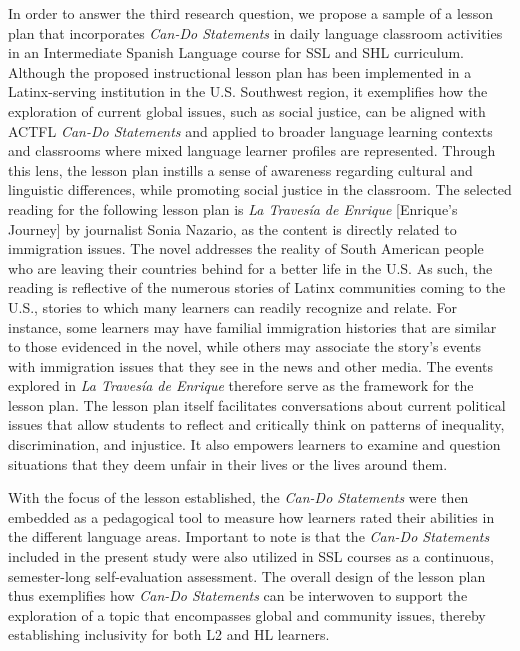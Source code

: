 \documentclass[output=paper]{langscibook}
\begin{document}
In order to answer the third research question, we propose a sample of a lesson plan that incorporates \textit{Can-Do Statements} in daily language classroom activities in an Intermediate Spanish Language course for SSL and SHL curriculum. Although the proposed instructional lesson plan has been implemented in a Latinx-serving institution in the U.S. Southwest region, it exemplifies how the exploration of current global issues, such as social justice, can be aligned with ACTFL \textit{Can-Do Statements} and applied to broader language learning contexts and classrooms where mixed language learner profiles are represented. Through this lens, the lesson plan instills a sense of awareness regarding cultural and linguistic differences, while promoting social justice in the classroom. The selected reading for the following lesson plan is \textit{La Travesía de Enrique} [Enrique’s Journey] by journalist Sonia Nazario, as the content is directly related to immigration issues. The novel addresses the reality of South American people who are leaving their countries behind for a better life in the U.S. As such, the reading is reflective of the numerous stories of Latinx communities coming to the U.S., stories to which many learners can readily recognize and relate. For instance, some learners may have familial immigration histories that are similar to those evidenced in the novel, while others may associate the story’s events with immigration issues that they see in the news and other media. The events explored in \textit{La Travesía de Enrique} therefore serve as the framework for the lesson plan. The lesson plan itself facilitates conversations about current political issues that allow students to reflect and critically think on patterns of inequality, discrimination, and injustice. It also empowers learners to examine and question situations that they deem unfair in their lives or the lives around them.

With the focus of the lesson established, the \textit{Can-Do Statements} were then embedded as a pedagogical tool to measure how learners rated their abilities in the different language areas. Important to note is that the \textit{Can-Do Statements} included in the present study were also utilized in SSL courses as a continuous, semester-long self-evaluation assessment. The overall design of the lesson plan thus exemplifies how \textit{Can-Do Statements} can be interwoven to support the exploration of a topic that encompasses global and community issues, thereby establishing inclusivity for both L2 and HL learners.
\end{document}
